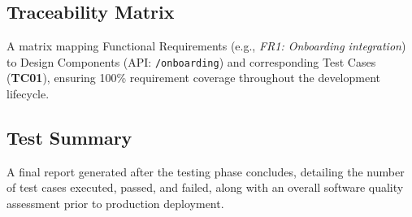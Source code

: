 \documentclass[12pt,a4paper]{report}
\begin{document}
\subsection{Traceability Matrix}
A matrix mapping Functional Requirements (e.g., \textit{FR1: Onboarding integration}) to Design
Components (API: \texttt{/onboarding}) and corresponding Test Cases (\textbf{TC01}), ensuring
100\% requirement coverage throughout the development lifecycle.

\subsection{Test Summary}
A final report generated after the testing phase concludes, detailing the number of test cases
executed, passed, and failed, along with an overall software quality assessment prior to
production deployment.
\end{document}
